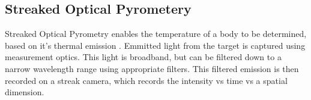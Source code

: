\subsection{Streaked Optical Pyrometery} \label{SOP theory}

Streaked Optical Pyrometry enables the temperature of a body to be determined, based on it's thermal emission \cite{Zeldovich1966}. Emmitted light from the target is captured using measurement optics. This light is broadband, but can be filtered down to a narrow wavelength range using appropriate filters. This filtered emission is then recorded on a streak camera, which records the intensity vs time vs a spatial dimension.


